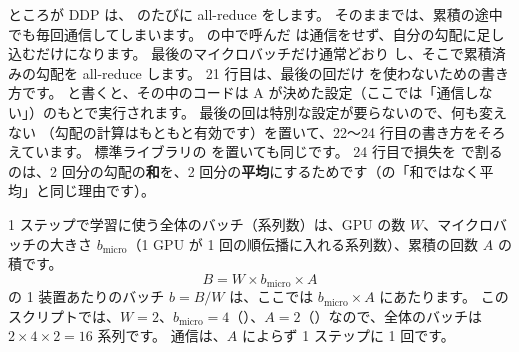 ところが DDP は、 のたびに all-reduce をします。
そのままでは、累積の途中でも毎回通信してしまいます。
 の中で呼んだ  は通信をせず、自分の勾配に足し込むだけになります。
最後のマイクロバッチだけ通常どおり  し、そこで累積済みの勾配を all-reduce します。
21 行目は、最後の回だけ  を使わないための書き方です。
 と書くと、その中のコードは A が決めた設定（ここでは「通信しない」）のもとで実行されます。
最後の回は特別な設定が要らないので、何も変えない （勾配の計算はもともと有効です）を置いて、22〜24 行目の書き方をそろえています。
標準ライブラリの  を置いても同じです。
24 行目で損失を  で割るのは、2 回分の勾配の\textbf{和}を、2 回分の\textbf{平均}にするためです（の「和ではなく平均」と同じ理由です）。

1 ステップで学習に使う全体のバッチ（系列数）は、GPU の数 $W$、マイクロバッチの大きさ $b_{\text{micro}}$（1 GPU が 1 回の順伝播に入れる系列数）、累積の回数 $A$ の積です。
\begin{equation}
B=W\times b_{\text{micro}}\times A
\label{eq:dist-global-batch}
\end{equation}
の 1 装置あたりのバッチ $b=B/W$ は、ここでは $b_{\text{micro}}\times A$ にあたります。
このスクリプトでは、$W=2$、$b_{\text{micro}}=4$（）、$A=2$（）なので、全体のバッチは $2\times4\times2=16$ 系列です。
通信は、$A$ によらず 1 ステップに 1 回です。

